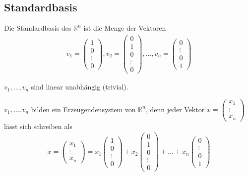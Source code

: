 
\subsection{Standardbasis}
Die Standardbasis des $\mathbb{R}^n$ ist die Menge der Vektoren
\begin{align*}
	v_1 = \begin{pmatrix}1\\0\\\vdots\\0\end{pmatrix}, v_2 = \begin{pmatrix}0\\1\\0\\\vdots\\0\end{pmatrix}, \dots, v_n = \begin{pmatrix}0\\\vdots\\0\\1\end{pmatrix}
\end{align*}

$v_1,\dots,v_n$ sind linear unabhängig (trivial).

$v_1,\dots,v_n$ bilden ein Erzeugendensystem von $\mathbb{R}^n$, denn jeder Vektor $x = \begin{pmatrix}x_1\\\vdots\\x_n\end{pmatrix}$ lässt sich schreiben als
\begin{align*}
	x = \begin{pmatrix}x_1\\\vdots\\x_n\end{pmatrix} = x_1\begin{pmatrix}1\\0\\\vdots\\0\end{pmatrix} + x_2\begin{pmatrix}0\\1\\0\\\vdots\\0\end{pmatrix} +\dots+x_n\begin{pmatrix}0\\\vdots\\0\\1\end{pmatrix}
\end{align*}


